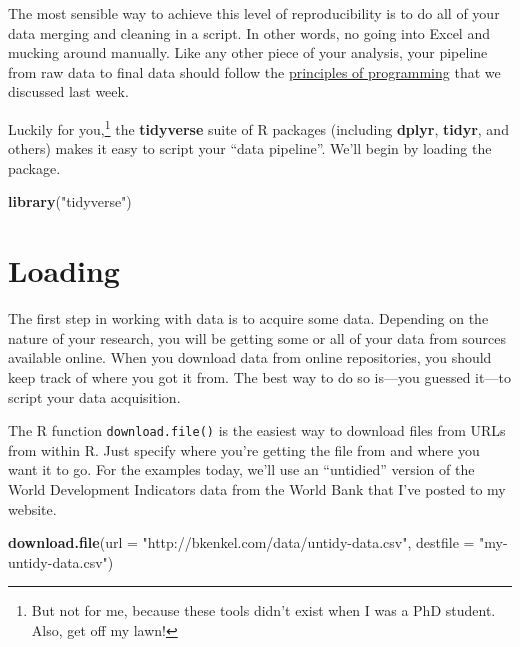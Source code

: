 \documentclass[
  12pt,
  oneside,openany]{book}
\newenvironment{Shaded}{\begin{snugshade}}{\end{snugshade}}
\newcommand{\DataTypeTok}[1]{\textcolor[rgb]{0.13,0.29,0.53}{#1}}
\newcommand{\KeywordTok}[1]{\textcolor[rgb]{0.13,0.29,0.53}{\textbf{#1}}}
\newcommand{\NormalTok}[1]{#1}
\newcommand{\StringTok}[1]{\textcolor[rgb]{0.31,0.60,0.02}{#1}}
\begin{document}
The most sensible way to achieve this level of reproducibility is to do all of your data merging and cleaning in a script. In other words, no going into Excel and mucking around manually. Like any other piece of your analysis, your pipeline from raw data to final data should follow the \protect\hyperlink{programming}{principles of programming} that we discussed last week.

Luckily for you,\footnote{But not for me, because these tools didn't exist when I was a PhD student. Also, get off my lawn!} the \textbf{tidyverse} suite of R packages (including \textbf{dplyr}, \textbf{tidyr}, and others) makes it easy to script your ``data pipeline''. We'll begin by loading the package.

\begin{Shaded}
\begin{Highlighting}[]
\KeywordTok{library}\NormalTok{(}\StringTok{"tidyverse"}\NormalTok{)}
\end{Highlighting}
\end{Shaded}

\hypertarget{loading}{%
\section{Loading}\label{loading}}

The first step in working with data is to acquire some data. Depending on the nature of your research, you will be getting some or all of your data from sources available online. When you download data from online repositories, you should keep track of where you got it from. The best way to do so is---you guessed it---to script your data acquisition.

The R function \texttt{download.file()} is the easiest way to download files from URLs from within R. Just specify where you're getting the file from and where you want it to go. For the examples today, we'll use an ``untidied'' version of the World Development Indicators data from the World Bank that I've posted to my website.

\begin{Shaded}
\begin{Highlighting}[]
\KeywordTok{download.file}\NormalTok{(}\DataTypeTok{url =} \StringTok{"http://bkenkel.com/data/untidy{-}data.csv"}\NormalTok{,}
              \DataTypeTok{destfile =} \StringTok{"my{-}untidy{-}data.csv"}\NormalTok{)}
\end{Highlighting}
\end{Shaded}
\end{document}
